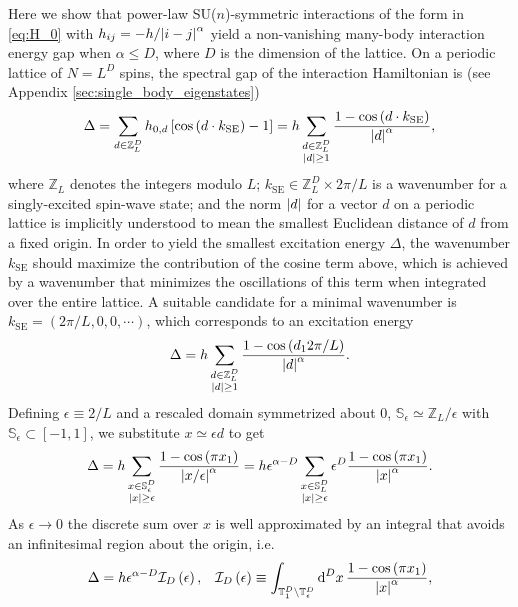 \documentclass[nofootinbib,notitlepage,11pt]{revtex4-2}
\renewcommand{\t}{\text} %
\newcommand{\f}[2]{\dfrac{#1}{#2}} %
\newcommand{\p}[1]{\left(#1\right)} %
\renewcommand{\sp}[1]{\left[#1\right]} %
\renewcommand{\c}{\cdot} %
\newcommand{\1}{\mathds{1}}
\renewcommand{\d}{\text{d}}
\newcommand{\I}{\mathcal{I}}
\renewcommand{\SS}{\mathbb{S}}
\newcommand{\TT}{\mathbb{T}}
\newcommand{\ZZ}{\mathbb{Z}}
\begin{document}
Here we show that power-law SU($n$)-symmetric interactions of the form
in \eqref{eq:H_0} with $h_{ij}=-h/\abs{i-j}^\alpha$ yield a
non-vanishing many-body interaction energy gap when $\alpha\le D$,
where $D$ is the dimension of the lattice.  On a periodic lattice of
$N=L^D$ spins, the spectral gap of the interaction Hamiltonian is (see
Appendix \ref{sec:single_body_eigenstates})
\begin{align}
  \Delta
  = \sum_{d\in\ZZ_L^D} h_{0,d} \sp{\cos\p{d \c k_{\t{SE}}}-1}
  = h \sum_{\substack{d\in\ZZ_L^D\\\abs{d}\ge1}}
  \f{1-\cos\p{d \c k_{\t{SE}}}}{\abs{d}^\alpha},
\end{align}
where $\ZZ_L$ denotes the integers modulo $L$;
$k_{\t{SE}}\in\ZZ_L^D\times2\pi/L$ is a wavenumber for a
singly-excited spin-wave state; and the norm $\abs{d}$ for a vector
$d$ on a periodic lattice is implicitly understood to mean the
smallest Euclidean distance of $d$ from a fixed origin.  In order to
yield the smallest excitation energy $\Delta$, the wavenumber
$k_{\t{SE}}$ should maximize the contribution of the cosine term
above, which is achieved by a wavenumber that minimizes the
oscillations of this term when integrated over the entire lattice.  A
suitable candidate for a minimal wavenumber is
$k_{\t{SE}}=\p{2\pi/L,0,0,\cdots}$, which corresponds to an excitation
energy
\begin{align}
  \Delta = h \sum_{\substack{d\in\ZZ_L^D\\\abs{d}\ge1}}
  \f{1-\cos\p{d_12\pi/L}}{\abs{d}^\alpha}.
\end{align}
Defining $\epsilon\equiv2/L$ and a rescaled domain symmetrized about
$0$, $\SS_\epsilon\simeq\ZZ_L/\epsilon$ with
$\SS_\epsilon\subset\sp{-1,1}$, we substitute $x\simeq\epsilon d$ to
get
\begin{align}
  \Delta
  = h \sum_{\substack{x\in\SS_\epsilon^D\\\abs{x}\ge\epsilon}}
  \f{1-\cos\p{\pi x_1}}{\abs{x/\epsilon}^\alpha}
  = h \epsilon^{\alpha-D} \sum_{\substack{x\in\SS_L^D\\\abs{x}\ge\epsilon}}
  \epsilon^D \f{1-\cos\p{\pi x_1}}{\abs{x}^\alpha}.
\end{align}
As $\epsilon\to0$ the discrete sum over $x$ is well approximated by an
integral that avoids an infinitesimal region about the origin, i.e.
\begin{align}
  \Delta = h \epsilon^{\alpha-D} \I_D\p{\epsilon},
  &&
  \I_D\p{\epsilon}
  \equiv \int_{\TT_1^D\setminus\TT_\epsilon^D} \d^Dx\,
  \f{1-\cos\p{\pi x_1}}{\abs{x}^\alpha},
\end{align}
\end{document}

